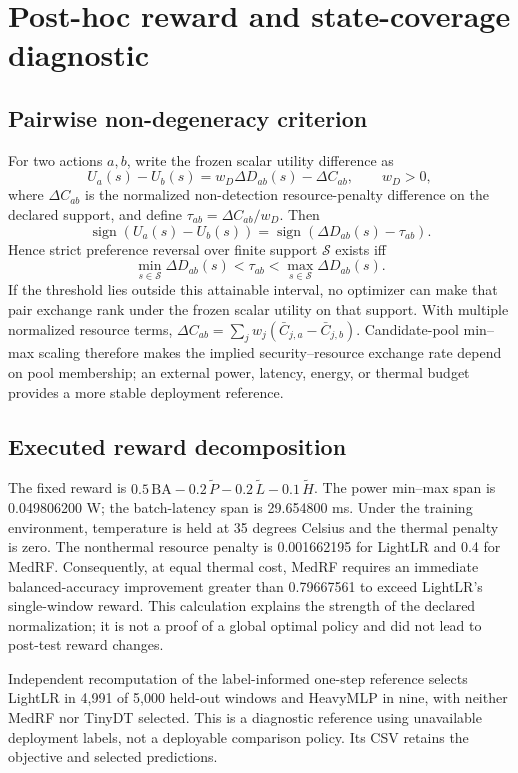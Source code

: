 \documentclass[10pt,a4paper]{article}
\begin{document}
\clearpage
\section{Post-hoc reward and state-coverage diagnostic}
\subsection{Pairwise non-degeneracy criterion}
For two actions $a,b$, write the frozen scalar utility difference as
\[
U_a(s)-U_b(s)=w_D\Delta D_{ab}(s)-\Delta C_{ab},\qquad w_D>0,
\]
where $\Delta C_{ab}$ is the normalized non-detection resource-penalty difference on the declared support, and define $\tau_{ab}=\Delta C_{ab}/w_D$. Then
\[
\operatorname{sign}(U_a(s)-U_b(s))=\operatorname{sign}(\Delta D_{ab}(s)-\tau_{ab}).
\]
Hence strict preference reversal over finite support $\mathcal S$ exists iff
\[
\min_{s\in\mathcal S}\Delta D_{ab}(s)<\tau_{ab}<\max_{s\in\mathcal S}\Delta D_{ab}(s).
\]
If the threshold lies outside this attainable interval, no optimizer can make that pair exchange rank under the frozen scalar utility on that support. With multiple normalized resource terms, $\Delta C_{ab}=\sum_j w_j(\bar C_{j,a}-\bar C_{j,b})$. Candidate-pool min--max scaling therefore makes the implied security--resource exchange rate depend on pool membership; an external power, latency, energy, or thermal budget provides a more stable deployment reference.

\subsection{Executed reward decomposition}
The fixed reward is $0.5\,\mathrm{BA}-0.2\,\widetilde P-0.2\,\widetilde L-0.1\,\widetilde H$. The power min--max span is 0.049806200 W; the batch-latency span is 29.654800 ms. Under the training environment, temperature is held at 35 degrees Celsius and the thermal penalty is zero. The nonthermal resource penalty is 0.001662195 for LightLR and 0.4 for MedRF. Consequently, at equal thermal cost, MedRF requires an immediate balanced-accuracy improvement greater than 0.79667561 to exceed LightLR's single-window reward. This calculation explains the strength of the declared normalization; it is not a proof of a global optimal policy and did not lead to post-test reward changes.

Independent recomputation of the label-informed one-step reference selects LightLR in 4,991 of 5,000 held-out windows and HeavyMLP in nine, with neither MedRF nor TinyDT selected. This is a diagnostic reference using unavailable deployment labels, not a deployable comparison policy. Its CSV retains the objective and selected predictions.
\end{document}
